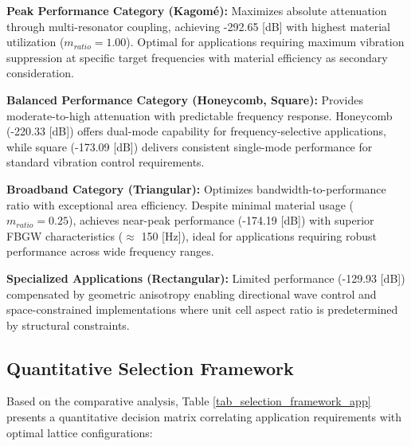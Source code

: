 \documentclass[review,numbers,sort&compress]{elsarticle}
\begin{document}
\textbf{Peak Performance Category (Kagomé):} Maximizes absolute attenuation through multi-resonator coupling, achieving -292.65 [dB] with highest material utilization ($m_{ratio} = 1.00$). Optimal for applications requiring maximum vibration suppression at specific target frequencies with material efficiency as secondary consideration.

\textbf{Balanced Performance Category (Honeycomb, Square):} Provides moderate-to-high attenuation with predictable frequency response. Honeycomb (-220.33 [dB]) offers dual-mode capability for frequency-selective applications, while square (-173.09 [dB]) delivers consistent single-mode performance for standard vibration control requirements.

\textbf{Broadband Category (Triangular):} Optimizes bandwidth-to-performance ratio with exceptional area efficiency. Despite minimal material usage ($m_{ratio} = 0.25$), achieves near-peak performance (-174.19 [dB]) with superior FBGW characteristics ($\approx$ 150 [Hz]), ideal for applications requiring robust performance across wide frequency ranges.

\textbf{Specialized Applications (Rectangular):} Limited performance (-129.93 [dB]) compensated by geometric anisotropy enabling directional wave control and space-constrained implementations where unit cell aspect ratio is predetermined by structural constraints.

\subsection{Quantitative Selection Framework}

Based on the comparative analysis, Table \ref{tab_selection_framework_app} presents a quantitative decision matrix correlating application requirements with optimal lattice configurations:
\end{document}
